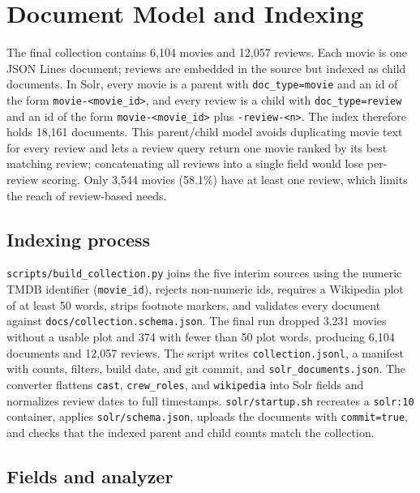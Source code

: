 
\section{Document Model and Indexing}
\label{sec:indexing}

The final collection contains 6{,}104 movies and 12{,}057 reviews. Each movie is
one JSON Lines document; reviews are embedded in the source but indexed as child
documents. In Solr, every movie is a parent with \texttt{doc\_type=movie} and an id
of the form \texttt{movie-<movie\_id>}, and every review is a child with
\texttt{doc\_type=review} and an id of the form \texttt{movie-<movie\_id>} plus
\texttt{-review-<n>}. The index therefore holds 18{,}161
documents. This parent/child model avoids duplicating movie text for every review
and lets a review query return one movie ranked by its best matching review;
concatenating all reviews into a single field would lose per-review scoring. Only
3{,}544 movies (58.1\%) have at least one review, which limits the reach of
review-based needs.

\subsection{Indexing process}
\label{sec:indexing-process}

\texttt{scripts/build\_collection.py} joins the five interim sources using the
numeric TMDB identifier (\texttt{movie\_id}), rejects non-numeric ids, requires a
Wikipedia plot of at least 50 words, strips footnote markers, and validates every
document against
\texttt{docs/collection.schema.json}. The final run dropped 3{,}231 movies without
a usable plot and 374 with fewer than 50 plot words, producing 6{,}104 documents
and 12{,}057 reviews. The script writes \texttt{collection.jsonl}, a manifest with
counts, filters, build date, and git commit, and \texttt{solr\_documents.json}.
The converter flattens \texttt{cast}, \texttt{crew\_roles}, and \texttt{wikipedia}
into Solr fields and normalizes review dates to full timestamps.
\texttt{solr/startup.sh} recreates a \texttt{solr:10} container, applies
\texttt{solr/schema.json}, uploads the documents with \texttt{commit=true}, and
checks that the indexed parent and child counts match the collection.

\subsection{Fields and analyzer}
\label{sec:fields}

